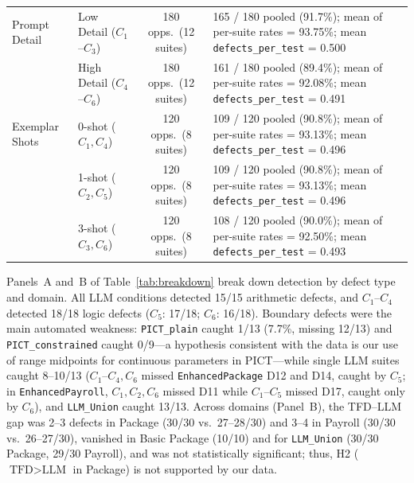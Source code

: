 \documentclass[acmsmall]{acmart}
\begin{document}
\begin{table}[t]
{\begin{tabular}{@{}ll ccccccc@{}}
    Prompt Detail & Low Detail ($C_1$--$C_3$) & 180 opps.\ (12 suites) & \multicolumn{6}{l}{165 / 180 pooled (91.7\%); mean of per-suite rates = 93.75\%; mean \texttt{defects\_per\_test} = 0.500} \\
    & High Detail ($C_4$--$C_6$) & 180 opps.\ (12 suites) & \multicolumn{6}{l}{161 / 180 pooled (89.4\%); mean of per-suite rates = 92.08\%; mean \texttt{defects\_per\_test} = 0.491} \\
    Exemplar Shots & 0-shot ($C_1, C_4$) & 120 opps.\ (8 suites) & \multicolumn{6}{l}{109 / 120 pooled (90.8\%); mean of per-suite rates = 93.13\%; mean \texttt{defects\_per\_test} = 0.496} \\
    & 1-shot ($C_2, C_5$) & 120 opps.\ (8 suites) & \multicolumn{6}{l}{109 / 120 pooled (90.8\%); mean of per-suite rates = 93.13\%; mean \texttt{defects\_per\_test} = 0.496} \\
    & 3-shot ($C_3, C_6$) & 120 opps.\ (8 suites) & \multicolumn{6}{l}{108 / 120 pooled (90.0\%); mean of per-suite rates = 92.50\%; mean \texttt{defects\_per\_test} = 0.493} \\
    \bottomrule
  \end{tabular}}
\end{table}

Panels~A and~B of Table~\ref{tab:breakdown} break down detection by defect type and domain. All LLM conditions detected 15/15 arithmetic defects, and $C_1$--$C_4$ detected 18/18 logic defects ($C_5$: 17/18; $C_6$: 16/18). Boundary defects were the main automated weakness: \texttt{PICT\_plain} caught 1/13 (7.7\%, missing 12/13) and \texttt{PICT\_constrained} caught 0/9---a hypothesis consistent with the data is our use of range midpoints for continuous parameters in PICT---while single LLM suites caught 8--10/13 ($C_1$--$C_4, C_6$ missed \texttt{EnhancedPackage} D12 and D14, caught by $C_5$; in \texttt{EnhancedPayroll}, $C_1, C_2, C_6$ missed D11 while $C_1$--$C_5$ missed D17, caught only by $C_6$), and \texttt{LLM\_Union} caught 13/13. Across domains (Panel~B), the TFD--LLM gap was 2--3 defects in Package (30/30 vs.\ 27--28/30) and 3--4 in Payroll (30/30 vs.\ 26--27/30), vanished in Basic Package (10/10) and for \texttt{LLM\_Union} (30/30 Package, 29/30 Payroll), and was not statistically significant; thus, H2 ($\text{TFD} > \text{LLM}$ in Package) is not supported by our data.
\end{document}

